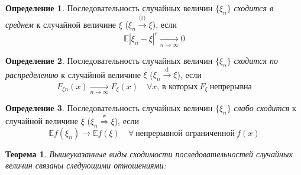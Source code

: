 \documentclass[oneside,final,14pt]{extreport}
\newtheorem{thm}{Теорема}[section]
\theoremstyle{definition}
\newtheorem{defn}{Определение}[section]
\begin{document}
\begin{defn}
    Последовательность случайных величин $\{\xi_n\}$ {\it сходится в среднем} к случайной величине $\xi$ ($\xi_n \xrightarrow[]{\text{(r)}} \xi$), если
    \begin{equation*}
        \mathbb{E}\left|\xi_{n}-\xi\right|^{r} \xrightarrow[n \to \infty]{} 0
    \end{equation*}
\end{defn}

\begin{defn}
    Последовательность случайных величин $\{\xi_n\}$ {\it сходится по распределению} к случайной величине $\xi$ ($\xi_n \xrightarrow[]{\text{d}} \xi$), если
    \begin{equation*}
        F_{\xi n}(x) \xrightarrow[n \to \infty]{} F_{\xi}(x) \quad \forall x, \, \text{в которых}~ F_{\xi} ~\text{непрерывна}
    \end{equation*}
\end{defn}

\begin{defn}
    Последовательность случайных величин $\{\xi_n\}$ {\it слабо сходится} к случайной величине $\xi$ ($\xi_n \stackrel{\text{w}}{\Rightarrow} \xi$), если
    \begin{equation*}
        \mathbb{E} f\left(\xi_{n}\right) \rightarrow \mathbb{E} f(\xi) \quad \forall~ \text{непрерывной ограниченной}~ f(x)
    \end{equation*}
\end{defn}
\pagebreak
\begin{thm}
    Вышеуказанные виды сходимости последовательностей случайных величин связаны следующими отношениями:
    
\end{thm}
\end{document}

